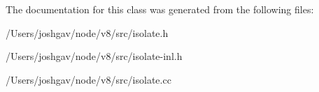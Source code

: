 The documentation for this class was generated from the following files\+:\begin{DoxyCompactItemize}
\item 
/\+Users/joshgav/node/v8/src/isolate.\+h\item 
/\+Users/joshgav/node/v8/src/isolate-\/inl.\+h\item 
/\+Users/joshgav/node/v8/src/isolate.\+cc\end{DoxyCompactItemize}

